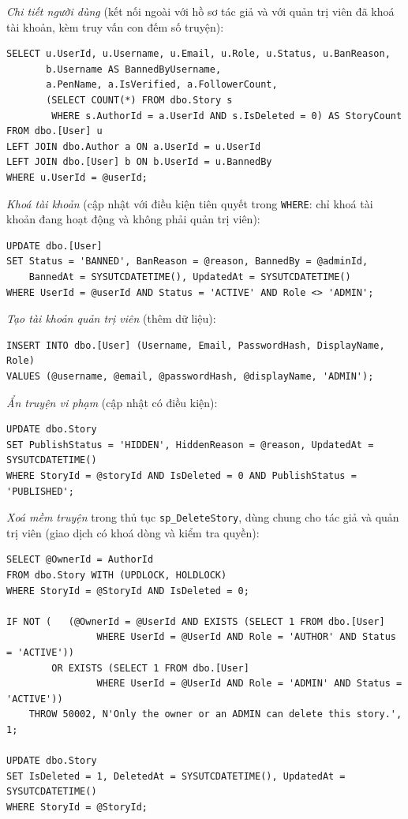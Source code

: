 \textit{Chi tiết người dùng} (kết nối ngoài với hồ sơ tác giả và với quản trị viên đã khoá tài khoản, kèm truy vấn con đếm số truyện):
\begin{verbatim}
SELECT u.UserId, u.Username, u.Email, u.Role, u.Status, u.BanReason,
       b.Username AS BannedByUsername,
       a.PenName, a.IsVerified, a.FollowerCount,
       (SELECT COUNT(*) FROM dbo.Story s
        WHERE s.AuthorId = a.UserId AND s.IsDeleted = 0) AS StoryCount
FROM dbo.[User] u
LEFT JOIN dbo.Author a ON a.UserId = u.UserId
LEFT JOIN dbo.[User] b ON b.UserId = u.BannedBy
WHERE u.UserId = @userId;
\end{verbatim}

\textit{Khoá tài khoản} (cập nhật với điều kiện tiên quyết trong \texttt{WHERE}: chỉ khoá tài khoản đang hoạt động và không phải quản trị viên):
\begin{verbatim}
UPDATE dbo.[User]
SET Status = 'BANNED', BanReason = @reason, BannedBy = @adminId,
    BannedAt = SYSUTCDATETIME(), UpdatedAt = SYSUTCDATETIME()
WHERE UserId = @userId AND Status = 'ACTIVE' AND Role <> 'ADMIN';
\end{verbatim}

\textit{Tạo tài khoản quản trị viên} (thêm dữ liệu):
\begin{verbatim}
INSERT INTO dbo.[User] (Username, Email, PasswordHash, DisplayName, Role)
VALUES (@username, @email, @passwordHash, @displayName, 'ADMIN');
\end{verbatim}

\textit{Ẩn truyện vi phạm} (cập nhật có điều kiện):
\begin{verbatim}
UPDATE dbo.Story
SET PublishStatus = 'HIDDEN', HiddenReason = @reason, UpdatedAt = SYSUTCDATETIME()
WHERE StoryId = @storyId AND IsDeleted = 0 AND PublishStatus = 'PUBLISHED';
\end{verbatim}

\textit{Xoá mềm truyện} trong thủ tục \texttt{sp\_DeleteStory}, dùng chung cho tác giả và quản trị viên (giao dịch có khoá dòng và kiểm tra quyền):
\begin{verbatim}
SELECT @OwnerId = AuthorId
FROM dbo.Story WITH (UPDLOCK, HOLDLOCK)
WHERE StoryId = @StoryId AND IsDeleted = 0;

IF NOT (   (@OwnerId = @UserId AND EXISTS (SELECT 1 FROM dbo.[User]
                WHERE UserId = @UserId AND Role = 'AUTHOR' AND Status = 'ACTIVE'))
        OR EXISTS (SELECT 1 FROM dbo.[User]
                WHERE UserId = @UserId AND Role = 'ADMIN' AND Status = 'ACTIVE'))
    THROW 50002, N'Only the owner or an ADMIN can delete this story.', 1;

UPDATE dbo.Story
SET IsDeleted = 1, DeletedAt = SYSUTCDATETIME(), UpdatedAt = SYSUTCDATETIME()
WHERE StoryId = @StoryId;
\end{verbatim}


